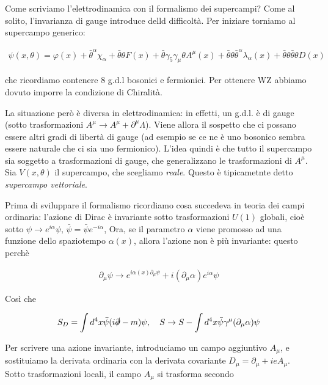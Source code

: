 \documentclass{report}
\begin{document}
Come scriviamo l'elettrodinamica con il formalismo dei supercampi? Come al solito, l'invarianza di gauge introduce delld difficoltà. Per iniziare torniamo al supercampo generico: 

\begin{align}
    \psi(x, \theta) = \varphi(x) + \bar{\theta}^\alpha \chi_\alpha + \bar{\theta}\theta F(x) + \bar{\theta}\gamma_5\gamma_\mu \theta A^\mu (x) + \bar{\theta}\theta \bar{\theta}^\alpha \lambda_\alpha (x) + \bar{\theta}\theta \bar{\theta}\theta D(x)
\end{align}

che ricordiamo contenere 8 g.d.l bosonici e fermionici. Per ottenere WZ abbiamo dovuto imporre la condizione di Chiralità. 

La situazione però è diversa in elettrodinamica: in effetti, un g.d.l. è di gauge (sotto trasformazioni \(A^\mu \to A^\mu + \partial^\mu \Lambda\)). Viene allora il sospetto che ci possano essere altri gradi di libertà di gauge (ad esempio se ce ne è uno bosonico sembra essere naturale che ci sia uno fermionico). L'idea quindi è che tutto il supercampo sia soggetto a trasformazioni di gauge, che generalizzano le trasformazioni di \(A^\mu\). Sia \(V(x, \theta)\) il supercampo, che scegliamo \emph{reale}. Questo è tipicametnte detto \emph{supercampo vettoriale}. 

Prima di sviluppare il formalismo ricordiamo cosa succedeva in teoria dei campi ordinaria: l'azione di Dirac è invariante sotto trasformazioni \(U(1)\) globali, cioè sotto \(\psi \to e^{i\alpha}\psi, \, \bar{\psi} = \bar{\psi}e^{-i\alpha}\), Ora, se il parametro \(\alpha\) viene promosso ad una funzione dello spaziotempo \(\alpha(x)\), allora l'azione non è più invariante: questo perchè 

\begin{align}
    \partial_\mu \psi \to e^{i\alpha(x)\partial_\mu \psi} + i(\partial_\mu\alpha) e^{i\alpha}\psi
\end{align}

Così che 

\begin{align}
    S_D = \int d^4x \bar{\psi}(i\slashed{\partial}-m)\psi, \quad S \to S - \int d^4x \bar{\psi}\gamma^\mu (\partial_\mu \alpha) \psi
\end{align}

Per scrivere una azione invariante, introduciamo un campo aggiuntivo \(A_\mu\), e sostituiamo la derivata ordinaria con la derivata covariante \(D_\mu = \partial_\mu +ieA_\mu\). Sotto trasformazioni locali, il campo \(A_\mu\) si trasforma secondo 
\end{document}
